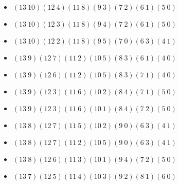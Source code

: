 \documentclass{article}
\begin{document}
\begin{itemize}
\item $(13\ 10)(12\ 4)(11\ 8)(9\ 3)(7\ 2)(6\ 1)(5\ 0)$
\item $(13\ 10)(12\ 3)(11\ 8)(9\ 4)(7\ 2)(6\ 1)(5\ 0)$
\item $(13\ 10)(12\ 2)(11\ 8)(9\ 5)(7\ 0)(6\ 3)(4\ 1)$
\item $(13\ 9)(12\ 7)(11\ 2)(10\ 5)(8\ 3)(6\ 1)(4\ 0)$
\item $(13\ 9)(12\ 6)(11\ 2)(10\ 5)(8\ 3)(7\ 1)(4\ 0)$
\item $(13\ 9)(12\ 3)(11\ 6)(10\ 2)(8\ 4)(7\ 1)(5\ 0)$
\item $(13\ 9)(12\ 3)(11\ 6)(10\ 1)(8\ 4)(7\ 2)(5\ 0)$
\item $(13\ 8)(12\ 7)(11\ 5)(10\ 2)(9\ 0)(6\ 3)(4\ 1)$
\item $(13\ 8)(12\ 7)(11\ 2)(10\ 5)(9\ 0)(6\ 3)(4\ 1)$
\item $(13\ 8)(12\ 6)(11\ 3)(10\ 1)(9\ 4)(7\ 2)(5\ 0)$
\item $(13\ 7)(12\ 5)(11\ 4)(10\ 3)(9\ 2)(8\ 1)(6\ 0)$
\end{itemize}
\end{document}
